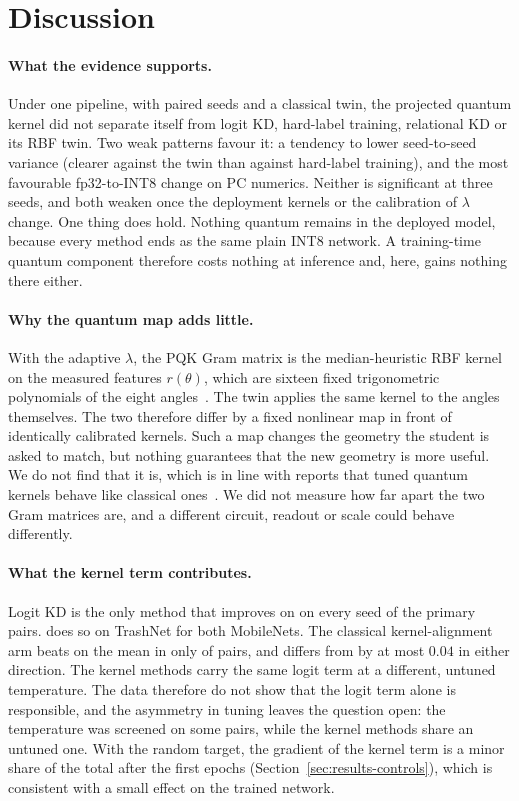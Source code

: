 \section{Discussion}
\label{sec:discussion}

\paragraph{What the evidence supports.}
Under one pipeline, with paired seeds and a classical twin, the projected quantum kernel did not separate itself from logit KD, hard-label training, relational KD or its RBF twin.
Two weak patterns favour it: a tendency to lower seed-to-seed variance (clearer against the twin than against hard-label training), and the most favourable fp32-to-INT8 change on PC numerics. Neither is significant at three seeds, and both weaken once the deployment kernels or the calibration of $\lambda$ change.
One thing does hold. Nothing quantum remains in the deployed model, because every method ends as the same plain INT8 network. A training-time quantum component therefore costs nothing at inference and, here, gains nothing there either.

\paragraph{Why the quantum map adds little.}
With the adaptive $\lambda$, the PQK Gram matrix is the median-heuristic RBF kernel on the measured features $r(\theta)$, which are sixteen fixed trigonometric polynomials of the eight angles~\citep{schuld2021effect}. The twin applies the same kernel to the angles themselves.
The two therefore differ by a fixed nonlinear map in front of identically calibrated kernels.
Such a map changes the geometry the student is asked to match, but nothing guarantees that the new geometry is more useful. We do not find that it is, which is in line with reports that tuned quantum kernels behave like classical ones~\citep{florezablan2025similarity}.
We did not measure how far apart the two Gram matrices are, and a different circuit, readout or scale could behave differently.

\paragraph{What the kernel term contributes.}
Logit KD is the only method that improves on \Scratch on every seed of the primary pairs. \Kd does so on TrashNet for both MobileNets. The classical kernel-alignment arm beats \Scratch on the mean in only \RbfBeatsScratch{} of \NPairs{} pairs, and \Pqk differs from \Scratch by at most $0.04$ in either direction.
The kernel methods carry the same logit term at a different, untuned temperature. The data therefore do not show that the logit term alone is responsible, and the asymmetry in tuning leaves the question open: the \Kd temperature was screened on some pairs, while the kernel methods share an untuned one.
With the random target, the gradient of the kernel term is a minor share of the total after the first epochs (Section~\ref{sec:results-controls}), which is consistent with a small effect on the trained network.

